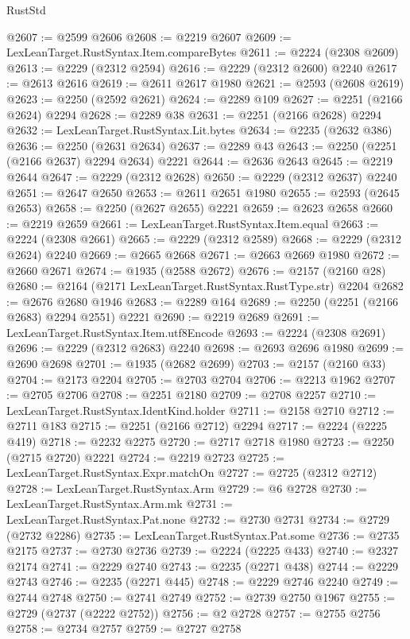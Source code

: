 \begin{lexlean}{RustStd}
\begin{coremodule}
{\begin{coremodule}
{{{{{{{{{{{{{{{{{{{{{{{{{{{{{{{{{{{{{{{{{{{{{{{{{{{{{@2607 := @2599 @2606
@2608 := @2219 @2607
@2609 := LexLeanTarget.RustSyntax.Item.compareBytes
@2611 := @2224 (@2308 @2609)
@2613 := @2229 (@2312 @2594)
@2616 := @2229 (@2312 @2600) @2240
@2617 := @2613 @2616
@2619 := @2611 @2617 @1980
@2621 := @2593 (@2608 @2619)
@2623 := @2250 (@2592 @2621)
@2624 := @2289 @109
@2627 := @2251 (@2166 @2624) @2294
@2628 := @2289 @38
@2631 := @2251 (@2166 @2628) @2294
@2632 := LexLeanTarget.RustSyntax.Lit.bytes
@2634 := @2235 (@2632 @386)
@2636 := @2250 (@2631 @2634)
@2637 := @2289 @43
@2643 := @2250 (@2251 (@2166 @2637) @2294 @2634) @2221
@2644 := @2636 @2643
@2645 := @2219 @2644
@2647 := @2229 (@2312 @2628)
@2650 := @2229 (@2312 @2637) @2240
@2651 := @2647 @2650
@2653 := @2611 @2651 @1980
@2655 := @2593 (@2645 @2653)
@2658 := @2250 (@2627 @2655) @2221
@2659 := @2623 @2658
@2660 := @2219 @2659
@2661 := LexLeanTarget.RustSyntax.Item.equal
@2663 := @2224 (@2308 @2661)
@2665 := @2229 (@2312 @2589)
@2668 := @2229 (@2312 @2624) @2240
@2669 := @2665 @2668
@2671 := @2663 @2669 @1980
@2672 := @2660 @2671
@2674 := @1935 (@2588 @2672)
@2676 := @2157 (@2160 @28)
@2680 := @2164 (@2171 LexLeanTarget.RustSyntax.RustType.str) @2204
@2682 := @2676 @2680 @1946
@2683 := @2289 @164
@2689 := @2250 (@2251 (@2166 @2683) @2294 @2551) @2221
@2690 := @2219 @2689
@2691 := LexLeanTarget.RustSyntax.Item.utf8Encode
@2693 := @2224 (@2308 @2691)
@2696 := @2229 (@2312 @2683) @2240
@2698 := @2693 @2696 @1980
@2699 := @2690 @2698
@2701 := @1935 (@2682 @2699)
@2703 := @2157 (@2160 @33)
@2704 := @2173 @2204
@2705 := @2703 @2704
@2706 := @2213 @1962
@2707 := @2705 @2706
@2708 := @2251 @2180
@2709 := @2708 @2257
@2710 := LexLeanTarget.RustSyntax.IdentKind.holder
@2711 := @2158 @2710
@2712 := @2711 @183
@2715 := @2251 (@2166 @2712) @2294
@2717 := @2224 (@2225 @419)
@2718 := @2232 @2275
@2720 := @2717 @2718 @1980
@2723 := @2250 (@2715 @2720) @2221
@2724 := @2219 @2723
@2725 := LexLeanTarget.RustSyntax.Expr.matchOn
@2727 := @2725 (@2312 @2712)
@2728 := LexLeanTarget.RustSyntax.Arm
@2729 := @6 @2728
@2730 := LexLeanTarget.RustSyntax.Arm.mk
@2731 := LexLeanTarget.RustSyntax.Pat.none
@2732 := @2730 @2731
@2734 := @2729 (@2732 @2286)
@2735 := LexLeanTarget.RustSyntax.Pat.some
@2736 := @2735 @2175
@2737 := @2730 @2736
@2739 := @2224 (@2225 @433)
@2740 := @2327 @2174
@2741 := @2229 @2740
@2743 := @2235 (@2271 @438)
@2744 := @2229 @2743
@2746 := @2235 (@2271 @445)
@2748 := @2229 @2746 @2240
@2749 := @2744 @2748
@2750 := @2741 @2749
@2752 := @2739 @2750 @1967
@2755 := @2729 (@2737 (@2222 @2752))
@2756 := @2 @2728
@2757 := @2755 @2756
@2758 := @2734 @2757
@2759 := @2727 @2758
}}}}}}}}}}}}}}}}}}}}}}}}}}}}}}}}}}}}}}}}}}}}}}}}}}}}}
\end{coremodule}}
\end{coremodule}
\end{lexlean}
